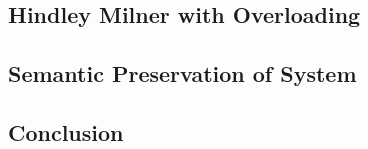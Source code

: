 \subsection{Hindley Milner with Overloading}
\subsection{Semantic Preservation of System \Fo}
\subsection{Conclusion}